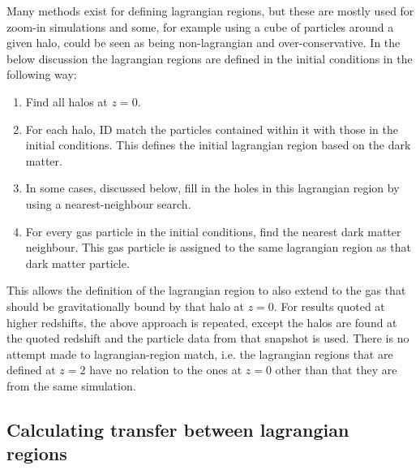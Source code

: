 Many methods exist for defining lagrangian regions, but these are mostly used for
zoom-in simulations and some, for example using a cube of particles around a given
halo, could be seen as being non-lagrangian and over-conservative. In the below
discussion the lagrangian regions are defined in the initial conditions in the
following way:
\begin{enumerate}
	\item Find all halos at $z=0$.

    \item For each halo, ID match the particles contained within it with those
		  in the initial conditions. This defines the initial lagrangian region
		  based on the dark matter.

	\item In some cases, discussed below, fill in the holes in this lagrangian
	      region by using a nearest-neighbour search.

	\item For every gas particle in the initial conditions, find the nearest dark
	      matter neighbour. This gas particle is assigned to the same lagrangian
	      region as that dark matter particle.
\end{enumerate}
This allows the definition of the lagrangian region to also extend to the gas
that should be gravitationally bound by that halo at $z=0$. For results quoted
at higher redshifts, the above approach is repeated, except the halos are
found at the quoted redshift and the particle data from that snapshot is used.
There is no attempt made to lagrangian-region match, i.e. the lagrangian regions
that are defined at $z=2$ have no relation to the ones at $z=0$ other than that
they are from the same simulation.

\subsection{Calculating transfer between lagrangian regions}

